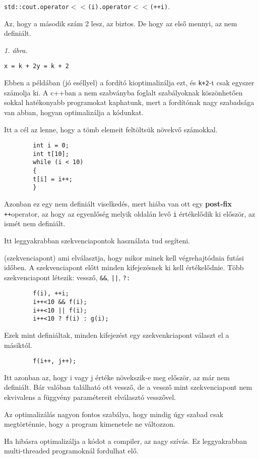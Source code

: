 \documentclass[a4paper,11.5pt]{article}
\begin{document}
	\texttt{std::cout.operator$<<$(i).operator$<<$(++i)}.
	
	Az, hogy a második szám 2 lesz, az biztos. De hogy az első mennyi, az nem definiált.
	
	\textit{1. ábra.}
	
	\begin{example}
		\texttt{x = k + 2}\quad \quad \texttt{y = k + 2}
	\end{example}
	
	Ebben a példában (jó eséllyel) a fordító kioptimalizálja ezt, és \texttt{k+2}-t csak egyszer számolja ki. A c++ban a nem szabványba foglalt szabályoknak köszönhetően sokkal hatékonyabb programokat kaphatunk, mert a fordítónak nagy szabadsága van abban, hogyan optimalizálja a kódunkat.
	
	\begin{example}
		Itt a cél az lenne, hogy a tömb elemeit feltöltsük növekvő számokkal.
		
		\begin{lstlisting}
		int i = 0;
		int t[10];
		while (i < 10)
		{
		t[i] = i++;
		}
		\end{lstlisting}
		
		Azonban ez egy nem definiált viselkedés, mert hiába van ott egy \textbf{post-fix} \texttt{++}\quad operator, az hogy az egyenlőség melyik oldalán levő \texttt{i} értékelődik ki először, az ismét nem definiált.
	\end{example}
	
	Itt leggyakrabban szekvenciapontok használata tud segíteni.
	
	\begin{definition}
		(szekvenciapont) ami elválasztja, hogy mikor minek kell végrehajtódnia futási időben. A szekvenciapont előtt minden kifejezésnek ki kell értékelődnie. Több szekvenciapont létezik: vessző, \texttt{\&\&}, \texttt{||}, \texttt{?\quad :} 
	\end{definition}
	\begin{example}
		\begin{lstlisting}
		f(i), ++i;
		i++<10 && f(i);
		i++<10 || f(i);
		i++<10 ? f(i) : g(i);
		\end{lstlisting}
		Ezek mint definiáltak, minden kifejezést egy szekvenkciapont választ el a másiktól.
		\begin{lstlisting}
		f(i++, j++);
		\end{lstlisting}
		Itt azonban az, hogy i vagy j értéke növekszik-e meg először, az már nem definiált. Bár valóban található ott vessző, de a vessző mint szekvenciapont nem ekvivalens a függvény paramétereit elválasztó vesszővel.
	\end{example}
	\begin{note}
		Az optimalizálás nagyon fontos szabálya, hogy mindig úgy szabad csak megtörténnie, hogy a program kimenetele ne változzon. 
	\end{note}
	\begin{note}
		Ha hibásra optimalizálja a kódot a compiler, az nagy szívás. Ez leggyakrabban multi-threaded programoknál fordulhat elő.
	\end{note}
	
\end{document}
